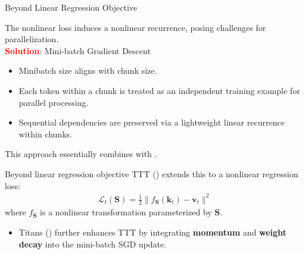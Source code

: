   \begin{frame}{Beyond Linear Regression Objective}

    The nonlinear loss induces a nonlinear recurrence, posing challenges for parallelization. \\
    \vspace{0.5em}
    \textcolor{red}{\textbf{Solution}}: Mini-batch Gradient Descent
    \begin{itemize}
        \item Minibatch size aligns with chunk size.
        \item Each token within a chunk is treated as an independent training example for parallel processing.
        \item Sequential dependencies are preserved via a lightweight linear recurrence within chunks.
    \end{itemize}
    \vspace{0.5em}
     This approach essentially combines {\color{red}{intra-chunk linear recurrence}} with {\color{red}{inter-chunk nonlinear recurrence}}.
\end{frame}

  \begin{frame}{Beyond linear regression objective}
    TTT (\cite{sun2024learning}) extends this to a nonlinear regression loss:
    \begin{align*}
      \mathcal{L}_t(\mathbf{S}) = \frac{1}{2}\|f_{\mathbf{S}}(\mathbf{k}_t) - \mathbf{v}_t\|^2
    \end{align*}
    where $f_{\mathbf{S}}$ is a nonlinear transformation parameterized by $\mathbf{S}$.

    \begin{itemize}
        \item Titans (\cite{behrouz2024titanslearningmemorizetest}) further enhances TTT by integrating {\color{red}\textbf{momentum}} and {\color{red}\textbf{weight decay}} into the mini-batch SGD update.
    \end{itemize}
  \end{frame}





